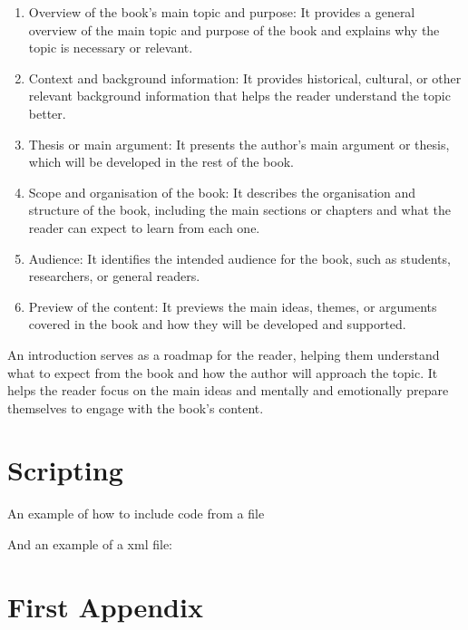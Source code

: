 \documentclass[12pt, twoside, a4paper]{book}
\begin{document}
\begin{enumerate}
    \item Overview of the book's main topic and purpose: It provides a general overview of the main topic and purpose of the book and explains why the topic is necessary or relevant.

    \item Context and background information: It provides historical, cultural, or other relevant background information that helps the reader understand the topic better.

    \item Thesis or main argument: It presents the author's main argument or thesis, which will be developed in the rest of the book.

    \item Scope and organisation of the book: It describes the organisation and structure of the book, including the main sections or chapters and what the reader can expect to learn from each one.

    \item Audience: It identifies the intended audience for the book, such as students, researchers, or general readers.

    \item Preview of the content: It previews the main ideas, themes, or arguments covered in the book and how they will be developed and supported.

\end{enumerate}

An introduction serves as a roadmap for the reader, helping them understand what to expect from the book and how the author will approach the topic. It helps the reader focus on the main ideas and mentally and emotionally prepare themselves to engage with the book's content.

\chapter{Scripting}

An example of how to include code from a file



And an example of a xml file:




\appendix

\chapter{First Appendix}

\backmatter
\end{document}
